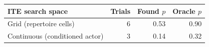 \begin{tabular}{lrrr}
\toprule
ITE search space & Trials & Found $p$ & Oracle $p$ \\
\midrule
Grid (repertoire cells) & 6 & 0.53 & 0.90 \\
Continuous (conditioned actor) & 3 & 0.14 & 0.32 \\
\bottomrule
\end{tabular}

